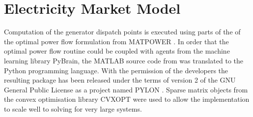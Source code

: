 %
%
%
%

\section{Electricity Market Model}
Computation of the generator dispatch points is executed using parts of the
of the optimal power flow formulation from MATPOWER \cite{zimmerman:mp_pes}.
In order that the optimal power flow routine could be coupled with agents from
the machine learning library PyBrain, the
MATLAB\textsuperscript{\texttrademark} source code from \matpower was
translated to the Python programming language.  With the permission of the
\matpower developers the resulting package has been released under the terms of
version 2 of the GNU General Public License as a project named
PYLON \cite{lincoln:pyreto}. Sparse matrix objects from the convex
optimisation library CVXOPT were used to allow the implementation to scale well to solving for very large systems.


